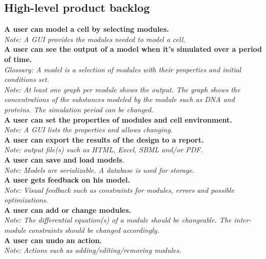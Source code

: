 \documentclass[10pt,a4paper]{report}
\begin{document}
		\subsection{High-level product backlog}
			\textbf{A user can model a cell by selecting modules.}\\
			\indent
				\textit{Note: A GUI provides the modules needed to model a cell.}\\
			\textbf{A user can see the output of a model when it’s simulated over a period of time.}\\
			\indent
				\textit{Glossary: A model is a selection of modules with their properties and initial conditions set.}\\
			\indent
				\textit{Note: At least one graph per module shows the output. The graph shows the concentrations of the substances modeled by the module such as DNA and proteins. The simulation period can be changed.}\\
			\textbf{A user can set the properties of modules and cell environment.}\\
			\indent
				\textit{Note: A GUI lists the properties and allows changing.}\\
			\textbf{A user can export the results of the design to a report.}\\
			\indent
				\textit{Note: output file(s) such as HTML, Excel, SBML and/or PDF.}\\
			\textbf{A user can save and load models}.\\
			\indent
				\textit{Note: Models are serializable. A database is used for storage.}\\
			\textbf{A user gets feedback on his model.}\\
			\indent
				\textit{Note: Visual feedback such as constraints for modules, errors and possible optimizations.}\\
			\textbf{A user can add or change modules.}\\
			\indent
				\textit{Note: The differential equation(s) of a module should be changeable. The inter-module constraints should be changed accordingly.}\\
			\textbf{A user can undo an action.}\\
			\indent
				\textit{Note: Actions such as adding/editing/removing modules.}\\
			
		\clearpage
\end{document}
